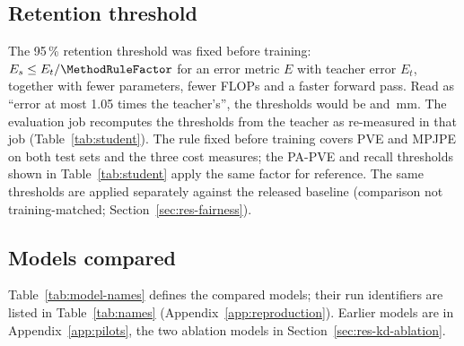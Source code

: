 

\subsection{Retention threshold}
\label{sec:method-retention}

The 95\,\% retention threshold was fixed before training: $E_s\le E_t/\MethodRuleFactor$ for an error
metric $E$ with teacher error $E_t$, together with fewer parameters, fewer FLOPs and a faster forward pass. Read as
``error at most 1.05 times the teacher's'', the thresholds would be \MethodBarHoldoutAlt{} and
\MethodBarThreeDPWAlt\,mm. The evaluation job recomputes the thresholds from the teacher as re-measured in that job
(Table~\ref{tab:student}). The rule fixed before training covers PVE and MPJPE on both test sets and the three cost
measures; the PA-PVE and recall thresholds shown in Table~\ref{tab:student} apply the same factor for reference. The
same thresholds are applied separately against the released baseline (comparison not
training-matched; Section~\ref{sec:res-fairness}).

\subsection{Models compared}
\label{sec:method-models}

Table~\ref{tab:model-names} defines the compared models; their run identifiers are listed in Table~\ref{tab:names}
(Appendix~\ref{app:reproduction}). Earlier models are in Appendix~\ref{app:pilots}, the two ablation models in Section~\ref{sec:res-kd-ablation}.

